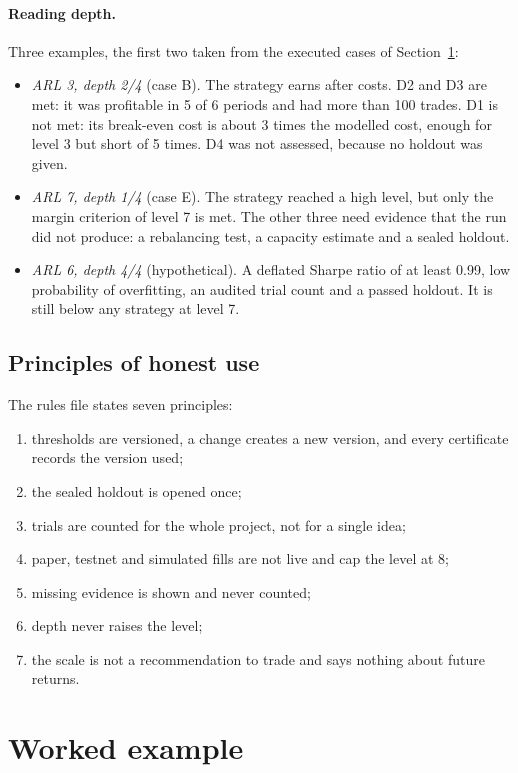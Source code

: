 \documentclass[11pt]{article}
\begin{document}
\paragraph{Reading depth.} Three examples, the first two taken from the executed cases of
Section~\ref{sec:example}:
\begin{itemize}
\item \emph{ARL 3, depth 2/4} (case B). The strategy earns after costs. D2 and D3 are met: it was profitable in 5 of 6
periods and had more than 100 trades. D1 is not met: its break-even cost is about 3 times the modelled cost, enough for
level 3 but short of 5 times. D4 was not assessed, because no holdout was given.
\item \emph{ARL 7, depth 1/4} (case E). The strategy reached a high level, but only the margin criterion of level 7 is
met. The other three need evidence that the run did not produce: a rebalancing test, a capacity estimate and a sealed
holdout.
\item \emph{ARL 6, depth 4/4} (hypothetical). A deflated Sharpe ratio of at least 0.99, low probability of overfitting,
an audited trial count and a passed holdout. It is still below any strategy at level 7.
\end{itemize}

\subsection{Principles of honest use}

The rules file states seven principles:
\begin{enumerate}
\item thresholds are versioned, a change creates a new version, and every certificate records the version used;
\item the sealed holdout is opened once;
\item trials are counted for the whole project, not for a single idea;
\item paper, testnet and simulated fills are not live and cap the level at 8;
\item missing evidence is shown and never counted;
\item depth never raises the level;
\item the scale is not a recommendation to trade and says nothing about future returns.
\end{enumerate}

\section{Worked example}\label{sec:example}
\end{document}
